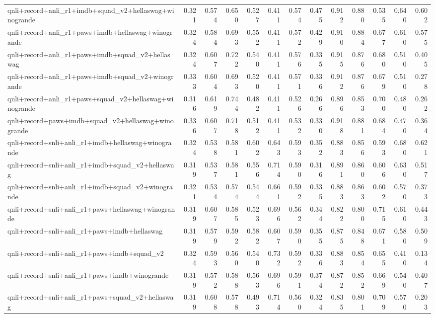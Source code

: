 \begin{table}[t]
\begin{tabular}{lrrrrrrrrrrrr}
    qnli+record+anli\_r1+imdb+squad\_v2+hellaswag+winogrande & 0.321 & 0.574 & 0.650 & 0.527 & 0.411 & 0.574 & 0.475 & 0.912 & 0.880 & 0.535 & 0.640 & 0.602 \\
    qnli+record+anli\_r1+paws+imdb+hellaswag+winogrande & 0.324 & 0.584 & 0.693 & 0.552 & 0.411 & 0.572 & 0.429 & 0.910 & 0.884 & 0.677 & 0.610 & 0.575 \\
    qnli+record+anli\_r1+paws+imdb+squad\_v2+hellaswag & 0.324 & 0.607 & 0.722 & 0.540 & 0.411 & 0.576 & 0.335 & 0.915 & 0.876 & 0.680 & 0.510 & 0.405 \\
    qnli+record+anli\_r1+paws+imdb+squad\_v2+winogrande & 0.333 & 0.604 & 0.693 & 0.520 & 0.411 & 0.571 & 0.336 & 0.912 & 0.876 & 0.679 & 0.510 & 0.278 \\
    qnli+record+anli\_r1+paws+squad\_v2+hellaswag+winogrande & 0.316 & 0.619 & 0.744 & 0.482 & 0.411 & 0.526 & 0.266 & 0.896 & 0.853 & 0.700 & 0.480 & 0.262 \\
    qnli+record+paws+imdb+squad\_v2+hellaswag+winogrande & 0.336 & 0.607 & 0.718 & 0.512 & 0.411 & 0.532 & 0.330 & 0.918 & 0.881 & 0.684 & 0.470 & 0.364 \\
    qnli+record+snli+anli\_r1+imdb+hellaswag+winogrande & 0.324 & 0.538 & 0.581 & 0.602 & 0.643 & 0.593 & 0.352 & 0.883 & 0.856 & 0.593 & 0.680 & 0.621 \\
    qnli+record+snli+anli\_r1+imdb+squad\_v2+hellaswag & 0.319 & 0.537 & 0.581 & 0.556 & 0.714 & 0.590 & 0.316 & 0.891 & 0.860 & 0.606 & 0.630 & 0.517 \\
    qnli+record+snli+anli\_r1+imdb+squad\_v2+winogrande & 0.321 & 0.534 & 0.574 & 0.544 & 0.661 & 0.592 & 0.335 & 0.883 & 0.863 & 0.602 & 0.570 & 0.373 \\
    qnli+record+snli+anli\_r1+paws+hellaswag+winogrande & 0.319 & 0.607 & 0.585 & 0.523 & 0.696 & 0.562 & 0.344 & 0.822 & 0.800 & 0.715 & 0.610 & 0.443 \\
    qnli+record+snli+anli\_r1+paws+imdb+hellaswag & 0.319 & 0.579 & 0.592 & 0.582 & 0.607 & 0.590 & 0.355 & 0.875 & 0.848 & 0.671 & 0.580 & 0.509 \\
    qnli+record+snli+anli\_r1+paws+imdb+squad\_v2 & 0.324 & 0.593 & 0.560 & 0.540 & 0.732 & 0.592 & 0.336 & 0.883 & 0.854 & 0.655 & 0.410 & 0.134 \\
    qnli+record+snli+anli\_r1+paws+imdb+winogrande & 0.319 & 0.572 & 0.588 & 0.563 & 0.696 & 0.591 & 0.374 & 0.872 & 0.852 & 0.669 & 0.540 & 0.407 \\
    qnli+record+snli+anli\_r1+paws+squad\_v2+hellaswag & 0.319 & 0.608 & 0.578 & 0.493 & 0.714 & 0.560 & 0.324 & 0.835 & 0.801 & 0.709 & 0.570 & 0.203 \\

\end{tabular}
\end{table}
